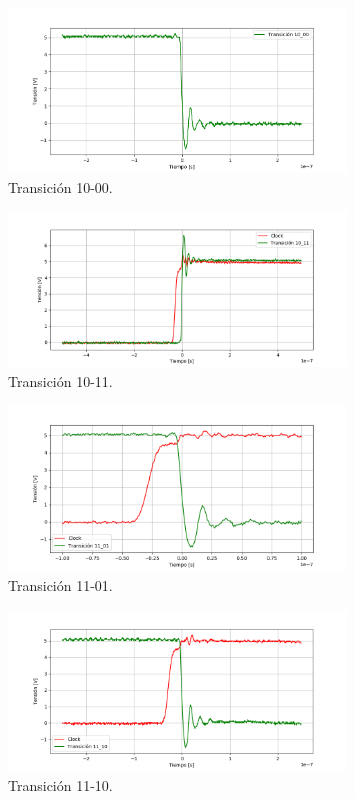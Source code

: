  \begin{figure}[H]
	\centering
	\includegraphics[width=0.8\textwidth]{ImagenesEjercicio1/10-00.PNG}
	\caption{Transición 10-00.}
	\label{fig:1000}
\end{figure}
 \begin{figure}[H]
	\centering
	\includegraphics[width=0.8\textwidth]{ImagenesEjercicio1/10-11.PNG}
	\caption{Transición 10-11.}
	\label{fig:1011}
\end{figure}
 \begin{figure}[H]
	\centering
	\includegraphics[width=0.8\textwidth]{ImagenesEjercicio1/11-01.PNG}
	\caption{Transición 11-01.}
	\label{fig:1101}
\end{figure}
 \begin{figure}[H]
	\centering
	\includegraphics[width=0.8\textwidth]{ImagenesEjercicio1/11-10.PNG}
	\caption{Transición 11-10.}
	\label{fig:1110}
\end{figure}
